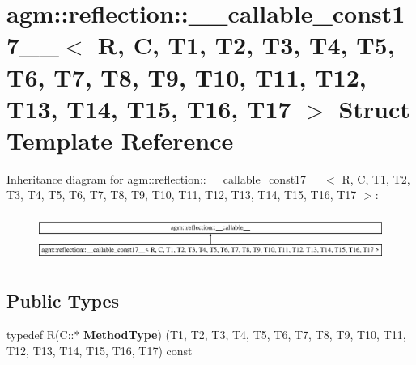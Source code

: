 \hypertarget{structagm_1_1reflection_1_1____callable__const17____}{}\section{agm\+:\+:reflection\+:\+:\+\_\+\+\_\+callable\+\_\+const17\+\_\+\+\_\+$<$ R, C, T1, T2, T3, T4, T5, T6, T7, T8, T9, T10, T11, T12, T13, T14, T15, T16, T17 $>$ Struct Template Reference}
\label{structagm_1_1reflection_1_1____callable__const17____}
Inheritance diagram for agm\+:\+:reflection\+:\+:\+\_\+\+\_\+callable\+\_\+const17\+\_\+\+\_\+$<$ R, C, T1, T2, T3, T4, T5, T6, T7, T8, T9, T10, T11, T12, T13, T14, T15, T16, T17 $>$\+:\begin{figure}[H]
\begin{center}
\leavevmode
\includegraphics[height=1.538461cm]{structagm_1_1reflection_1_1____callable__const17____}
\end{center}
\end{figure}
\subsection*{Public Types}
\begin{DoxyCompactItemize}
\item 
typedef R(C\+::$\ast$ {\bfseries Method\+Type}) (T1, T2, T3, T4, T5, T6, T7, T8, T9, T10, T11, T12, T13, T14, T15, T16, T17) const \hypertarget{structagm_1_1reflection_1_1____callable__const17_____abc62adcecea5005ee7c102e7d225317c}{}\label{structagm_1_1reflection_1_1____callable__const17_____abc62adcecea5005ee7c102e7d225317c}

\end{DoxyCompactItemize}
